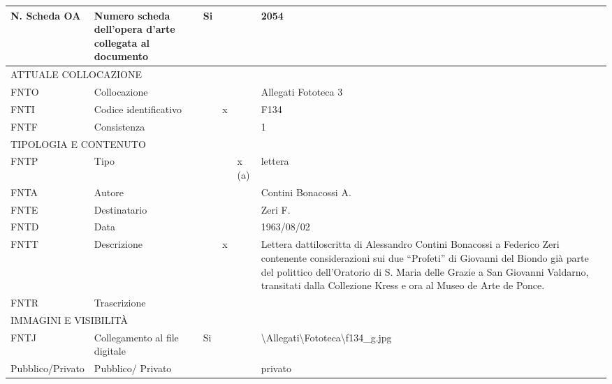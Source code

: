 \begin{center}
\begin{longtable}{ | p{1cm} | p{4cm} | p{.6cm} | p{.6cm} | p{.6cm} | p{5cm} | }
   N. Scheda OA & Numero scheda dell’opera d’arte collegata al documento & Si &  &  & 2054 \\ \hline
   \multicolumn{6}{|l|}{\cellcolor{lightcyan}ATTUALE COLLOCAZIONE}  \\ \hline
   FNTO & Collocazione &  &  &  & Allegati Fototeca 3 \\ \hline
   FNTI & Codice identificativo &  & x &  & F134 \\ \hline
   FNTF & Consistenza &  &  &  & 1 \\ \hline
   \multicolumn{6}{|l|}{\cellcolor{lightcyan}TIPOLOGIA E CONTENUTO}  \\ \hline
   FNTP & Tipo &  &  & x (a) & lettera \\ \hline
   FNTA & Autore &  &  &  & Contini Bonacossi A. \\ \hline
   FNTE & Destinatario &  &  &  & Zeri F. \\ \hline
   FNTD & Data &  &  &  & 1963/08/02 \\ \hline
   FNTT & Descrizione &  & x &  & Lettera dattiloscritta di Alessandro Contini Bonacossi a Federico Zeri contenente considerazioni sui due ``Profeti'' di Giovanni del Biondo già parte del polittico dell'Oratorio di S. Maria delle Grazie a San Giovanni Valdarno, transitati dalla Collezione Kress e ora al Museo de Arte de Ponce. \\ \hline
   FNTR & Trascrizione &  &  &  &  \\ \hline
   \multicolumn{6}{|l|}{\cellcolor{lightcyan}IMMAGINI E VISIBILITÀ}  \\ \hline
   FNTJ & Collegamento al file digitale & Si &  &  & \textbackslash{}Allegati\textbackslash{}Fototeca\textbackslash{}f134\_g.jpg \\ \hline
   Pubblico/Privato & Pubblico/ Privato &  &  &  & privato \\ \hline
\end{longtable}

  


\end{center}
